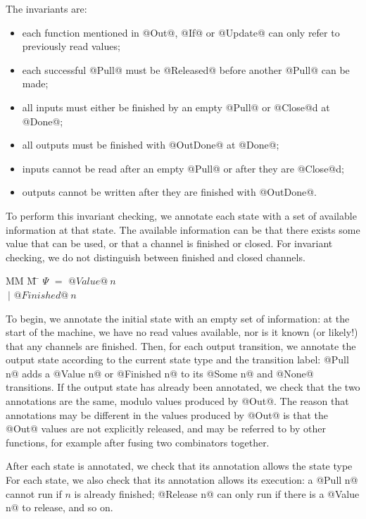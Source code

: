 The invariants are:
\begin{itemize}
\item each function mentioned in @Out@, @If@ or @Update@ can only refer to previously read values;
\item each successful @Pull@ must be @Released@ before another @Pull@ can be made;
\item all inputs must either be finished by an empty @Pull@ or @Close@d at @Done@;
\item all outputs must be finished with @OutDone@ at @Done@;
\item inputs cannot be read after an empty @Pull@ or after they are @Close@d;
\item outputs cannot be written after they are finished with @OutDone@.
\end{itemize}

To perform this invariant checking, we annotate each state with a set of available information at that state.
The available information can be that there exists some value that can be used, or that a channel is finished or closed.
For invariant checking, we do not distinguish between finished and closed channels.

\begin{tabbing}
MM \= M \= \kill
$\Psi$ \> $=$  \> $@Value@~n$ \\
       \> $~|$ \> $@Finished@~n$ \\
\end{tabbing}

To begin, we annotate the initial state with an empty set of information: at the start of the machine, we have no read values available, nor is it known (or likely!) that any channels are finished.
Then, for each output transition, we annotate the output state according to the current state type and the transition label: @Pull n@ adds a @Value n@ or @Finished n@ to its @Some n@ and @None@ transitions.
If the output state has already been annotated, we check that the two annotations are the same, modulo values produced by @Out@.
The reason that annotations may be different in the values produced by @Out@ is that the @Out@ values are not explicitly released, and may be referred to by other functions, for example after fusing two combinators together.



After each state is annotated, we check that its annotation allows the state type 
For each state, we also check that its annotation allows its execution: a @Pull n@ cannot run if $n$ is already finished; @Release n@ can only run if there is a @Value n@ to release, and so on.

